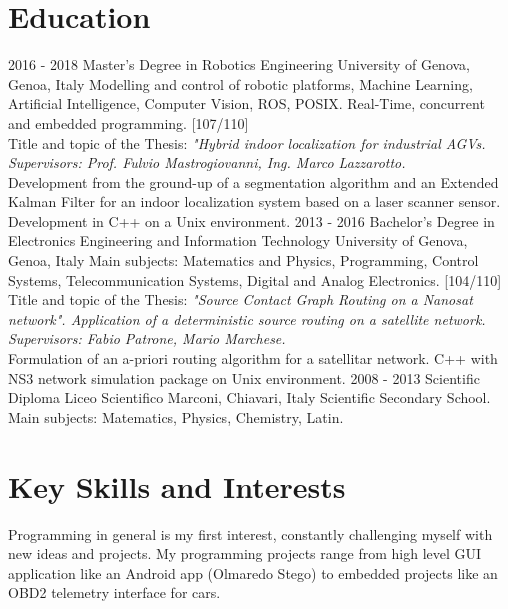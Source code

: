 \documentclass[]{friggeri-cv}
\begin{document}
\section{Education}
\begin{entrylist}
  \entry
    {2016 - 2018}
    {Master's Degree in Robotics Engineering}
    {University of Genova, Genoa, Italy}
    {Modelling and control of robotic platforms, Machine Learning, Artificial Intelligence, Computer Vision, ROS, POSIX. Real-Time, concurrent and embedded programming. [107/110]\\ Title and topic of the Thesis: 
    \emph{"Hybrid indoor localization for industrial AGVs. Supervisors: Prof. Fulvio Mastrogiovanni, Ing. Marco Lazzarotto.}\\ Development from the ground-up of a segmentation algorithm and an Extended Kalman Filter for an indoor localization system based on a laser scanner sensor. Development in C++ on a Unix environment.}
  \entry
    {2013 - 2016}
    {Bachelor's Degree in Electronics Engineering and Information Technology}
    {University of Genova, Genoa, Italy}
    {Main subjects: Matematics and Physics, Programming, Control Systems, Telecommunication Systems, Digital and Analog Electronics. [104/110]\\ Title and topic of the Thesis: 
    \emph{"Source Contact Graph Routing on a Nanosat network".
    Application of a deterministic source routing on a satellite network. Supervisors: Fabio Patrone, Mario Marchese.}\\ Formulation of an a-priori routing algorithm for a satellitar network. C++ with NS3 network simulation package on Unix environment. }
  \entry
    {2008 - 2013}
    {Scientific Diploma}
    {Liceo Scientifico Marconi, Chiavari, Italy}
    {Scientific Secondary School.\\
    Main subjects: Matematics, Physics, Chemistry, Latin.}
\end{entrylist}

\clearpage
\section{Key Skills and Interests}
	Programming in general is my first interest, constantly challenging myself with new ideas and projects. My programming projects range from high level GUI application like an Android app (Olmaredo Stego) to  embedded projects like an OBD2 telemetry interface for cars. 
	
\end{document}
